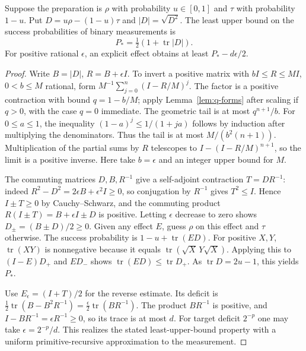 \begin{theorem}
\label{thm:q-helstrom}
Suppose the preparation is \(\rho\) with probability \(u\in[0,1]\)
and \(\tau\) with probability \(1-u\). Put
\(D=u\rho-(1-u)\tau\) and \(|D|=\sqrt{D^2}\).
The least upper bound on the success probabilities of binary measurements is
\[
             P_* = \tfrac12(1+\operatorname{tr}|D|).
\]
For positive rational \(\epsilon\), an explicit effect obtains at least
\(P_*-d\epsilon/2\).
\end{theorem}
\begin{proof}
Write \(B=|D|\), \(R=B+\epsilon I\). To invert a positive matrix with
\(bI\le R\le MI\), \(0<b\le M\) rational, form
\(M^{-1}\sum_{j=0}^{n}(I-R/M)^j\).
The factor is a positive contraction with bound \(q=1-b/M\);
apply Lemma~\ref{lem:q-forms} after scaling if \(q>0\), with the case
\(q=0\) immediate. The geometric tail is at most \(q^{n+1}/b\).
For \(0\le a\le1\), the inequality
\((1-a)^j\le1/(1+ja)\) follows by induction after multiplying the
denominators. Thus the tail is at most \(M/(b^2(n+1))\).
Multiplication of the partial sums by \(R\) telescopes to
\(I-(I-R/M)^{n+1}\), so the limit is a positive inverse. Here take
\(b=\epsilon\) and an integer upper bound for \(M\).

The commuting matrices \(D,B,R^{-1}\) give a self-adjoint contraction
\(T=D R^{-1}\): indeed \(R^2-D^2=2\epsilon B+\epsilon^2 I\ge0\),
so conjugation by \(R^{-1}\) gives \(T^2\le I\).
Hence \(I\pm T\ge0\) by Cauchy--Schwarz, and the commuting product
\(R(I\pm T)=B+\epsilon I\pm D\) is positive. Letting \(\epsilon\)
decrease to zero shows \(D_\pm=(B\pm D)/2\ge0\). Given any
effect \(E\), guess \(\rho\) on this effect and \(\tau\) otherwise.
The success probability is \(1-u+\operatorname{tr}(ED)\).
For positive \(X,Y\), \(\operatorname{tr}(XY)\) is nonnegative
because it equals \(\operatorname{tr}(\sqrt X\,Y\sqrt X)\).
Applying this to \((I-E)D_+\) and \(ED_-\) shows
\(\operatorname{tr}(ED)\le\operatorname{tr}D_+\). As
\(\operatorname{tr}D=2u-1\), this yields \(P_*\).

Use \(E_\epsilon=(I+T)/2\) for the reverse estimate. Its deficit is
\(\tfrac12\operatorname{tr}(B-B^2R^{-1})
=\tfrac{\epsilon}{2}\operatorname{tr}(B R^{-1})\).
The product \(BR^{-1}\) is positive, and
\(I-BR^{-1}=\epsilon R^{-1}\ge0\), so its trace is at most \(d\).
For target deficit \(2^{-p}\) one may take \(\epsilon=2^{-p}/d\).
This realizes the stated least-upper-bound property with a uniform
primitive-recursive approximation to the measurement.
\end{proof}

